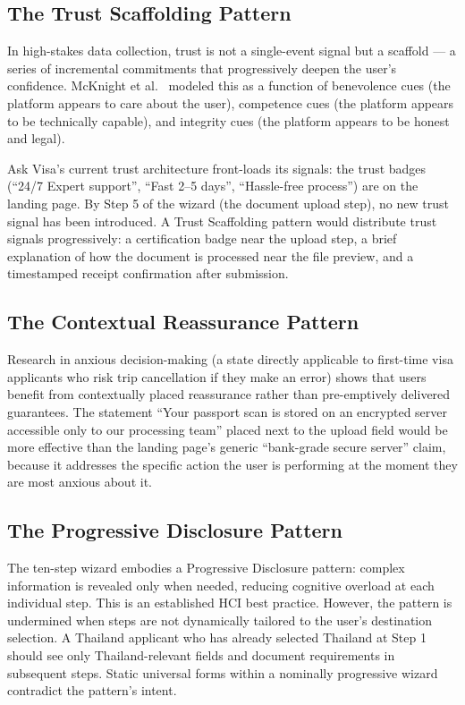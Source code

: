 \documentclass[journal, 10pt, twoside]{IEEEtran}
\begin{document}
\subsection{The Trust Scaffolding Pattern}
In high-stakes data collection, trust is not a single-event signal but a
scaffold --- a series of incremental commitments that progressively deepen
the user's confidence. McKnight et al.\ \cite{mcknight2002} modeled this
as a function of benevolence cues (the platform appears to care about the
user), competence cues (the platform appears to be technically capable),
and integrity cues (the platform appears to be honest and legal).

Ask Visa's current trust architecture front-loads its signals: the trust
badges (``24/7 Expert support'', ``Fast 2--5 days'', ``Hassle-free process'')
are on the landing page. By Step 5 of the wizard (the document upload step),
no new trust signal has been introduced. A Trust Scaffolding pattern would
distribute trust signals progressively: a certification badge near the
upload step, a brief explanation of how the document is processed near the
file preview, and a timestamped receipt confirmation after submission.

\subsection{The Contextual Reassurance Pattern}
Research in anxious decision-making (a state directly applicable to
first-time visa applicants who risk trip cancellation if they make an
error) shows that users benefit from contextually placed reassurance
rather than pre-emptively delivered guarantees. The statement ``Your
passport scan is stored on an encrypted server accessible only to
our processing team'' placed next to the upload field would be more
effective than the landing page's generic ``bank-grade secure server''
claim, because it addresses the specific action the user is performing
at the moment they are most anxious about it.

\subsection{The Progressive Disclosure Pattern}
The ten-step wizard embodies a Progressive Disclosure pattern: complex
information is revealed only when needed, reducing cognitive overload at
each individual step. This is an established HCI best practice. However,
the pattern is undermined when steps are not dynamically tailored to the
user's destination selection. A Thailand applicant who has already
selected Thailand at Step 1 should see only Thailand-relevant fields and
document requirements in subsequent steps. Static universal forms within
a nominally progressive wizard contradict the pattern's intent.
\end{document}
